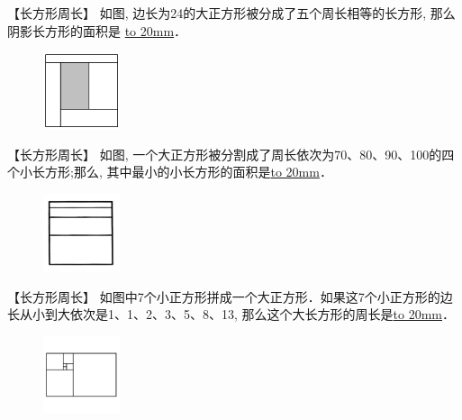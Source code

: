 \item {
    【长方形周长】
    如图, 边长为24的大正方形被分成了五个周长相等的长方形, 那么阴影长方形的面积是 \underline{\hbox to 20mm{}}．
    \begin{figure}[H] 
        \centering
        \includegraphics[width=0.2\textwidth]{./pics/Chapter_2/2.png}
    \end{figure}
    \vspace{1cm}
}
\item {
    【长方形周长】
    如图, 一个大正方形被分割成了周长依次为70、80、90、100的四个小长方形;那么, 其中最小的小长方形的面积是\underline{\hbox to 20mm{}}．
    \begin{figure}[H] 
        \centering
        \includegraphics[width=0.2\textwidth]{./pics/Chapter_2/4.png}
    \end{figure}
    \vspace{1cm}
}

\item {
    【长方形周长】
    如图中7个小正方形拼成一个大正方形．如果这7个小正方形的边长从小到大依次是1、1、2、3、5、8、13, 那么这个大长方形的周长是\underline{\hbox to 20mm{}}．
    \begin{figure}[H] 
        \centering
        \includegraphics[width=0.2\textwidth]{./pics/Chapter_2/20.png}
    \end{figure}
    \vspace{1cm}
}

